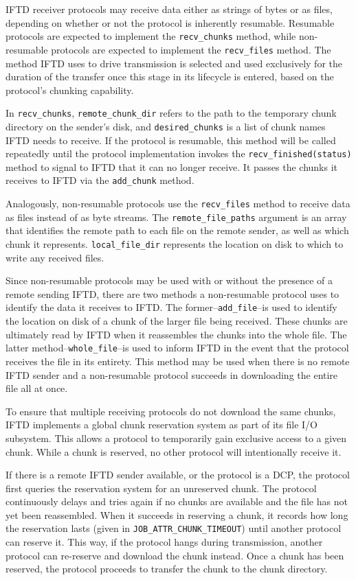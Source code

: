 IFTD receiver protocols may receive data either as strings of bytes or as files, depending on whether or not the protocol is inherently resumable.  Resumable protocols are expected to implement the \texttt{recv\_chunks} method, while non-resumable protocols are expected to implement the \texttt{recv\_files} method.  The method IFTD uses to drive transmission is selected and used exclusively for the duration of the transfer once this stage in its lifecycle is entered, based on the protocol's chunking capability.

In \texttt{recv\_chunks}, \texttt{remote\_chunk\_dir} refers to the path to the temporary chunk directory on the sender's disk, and \texttt{desired\_chunks} is a list of chunk names IFTD needs to receive.  If the protocol is resumable, this method will be called repeatedly until the protocol implementation invokes the \texttt{recv\_finished(status)} method to signal to IFTD that it can no longer receive.  It passes the chunks it receives to IFTD via the \texttt{add\_chunk} method.

Analogously, non-resumable protocols use the \texttt{recv\_files} method to receive data as files instead of as byte streams.  The \texttt{remote\_file\_paths} argument is an array that identifies the remote path to each file on the remote sender, as well as which chunk it represents.  \texttt{local\_file\_dir} represents the location on disk to which to write any received files.

Since non-resumable protocols may be used with or without the presence of a remote sending IFTD, there are two methods a non-resumable protocol uses to identify the data it receives to IFTD.  The former--\texttt{add\_file}--is used to identify the location on disk of a chunk of the larger file being received.  These chunks are ultimately read by IFTD when it reassembles the chunks into the whole file.  The latter method--\texttt{whole\_file}--is used to inform IFTD in the event that the protocol receives the file in its entirety.  This method may be used when there is no remote IFTD sender and a non-resumable protocol succeeds in downloading the entire file all at once.

To ensure that multiple receiving protocols do not download the same chunks, IFTD implements a global chunk reservation system as part of its file I/O subsystem.  This allows a protocol to temporarily gain exclusive access to a given chunk.  While a chunk is reserved, no other protocol will intentionally receive it.

If there is a remote IFTD sender available, or the protocol is a DCP, the protocol first queries the reservation system for an unreserved chunk.  The protocol continuously delays and tries again if no chunks are available and the file has not yet been reassembled.  When it succeeds in reserving a chunk, it records how long the reservation lasts (given in \texttt{JOB\_ATTR\_CHUNK\_TIMEOUT}) until another protocol can reserve it.  This way, if the protocol hangs during transmission, another protocol can re-reserve and download the chunk instead.  Once a chunk has been reserved, the protocol proceeds to transfer the chunk to the chunk directory.  

